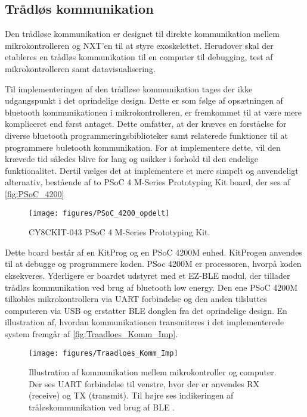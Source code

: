 \subsection{Trådløs kommunikation}\label{traadloes_komm_imp}
Den trådløse kommunikation er designet til direkte kommunikation mellem mikrokontrolleren og NXT'en til at styre exoskelettet. Herudover skal der etableres en trådløs kommunikation til en computer til debugging, test af mikrokontrolleren samt datavisualisering.   

\noindent
Til implementeringen af den trådløse kommunikation tages der ikke udgangspunkt i det oprindelige design. Dette er som følge af opsætningen af bluetooth kommunikationen i mikrokontrolleren, er fremkommet til at være mere kompliceret end først antaget. Dette omfatter, at der kræves en forståelse for diverse bluetooth programmeringsbiblioteker samt relaterede funktioner til at programmere buletooth kommunikation. For at implementere dette, vil den krævede tid således blive for lang og usikker i forhold til den endelige funktionalitet.
Dertil vælges det at implementere et mere simpelt og anvendeligt alternativ, bestående af to PSoC 4 M-Series Prototyping Kit board, der ses af \autoref{fig:PSoC_4200}

\begin{figure}[H]
	\centering
	\texttt{[image: figures/PSoC\_4200\_opdelt]}
	\caption{CY8CKIT-043 PSoC 4 M-Series Prototyping Kit\citep{cypresspsoc42015}.}
	\label{fig:PSoC_4200}
\end{figure}

\noindent
Dette board består af en KitProg og en PSoC 4200M enhed. KitProgen anvendes til at debugge og programmere koden. PSoc 4200M er processoren, hvorpå koden eksekveres. Yderligere er boardet udstyret med et EZ-BLE modul, der tillader trådløs kommunikation ved brug af bluetooth low energy. 
Den ene PSoC 4200M tilkobles mikrokontrollern via UART forbindelse og den anden tilsluttes computeren via USB og erstatter BLE donglen fra det oprindelige design. En illustration af, hvordan kommunikationen transmiteres i det implementerede system fremgår af \autoref{fig:Traadloes_Komm_Imp}.

\begin{figure}[H]
	\centering
	\texttt{[image: figures/Traadloes\_Komm\_Imp]}
	\caption{Illustration af kommunikation mellem mikrokontroller og computer. Der ses UART forbindelse til venstre, hvor der er anvendes RX (receive) og TX (transmit). Til højre ses indikeringen af tråløskommunikation ved brug af BLE \citep{cypresspsoc2015, cypresspsoc42015}.} 
	\label{fig:Traadloes_Komm_Imp}
\end{figure}

